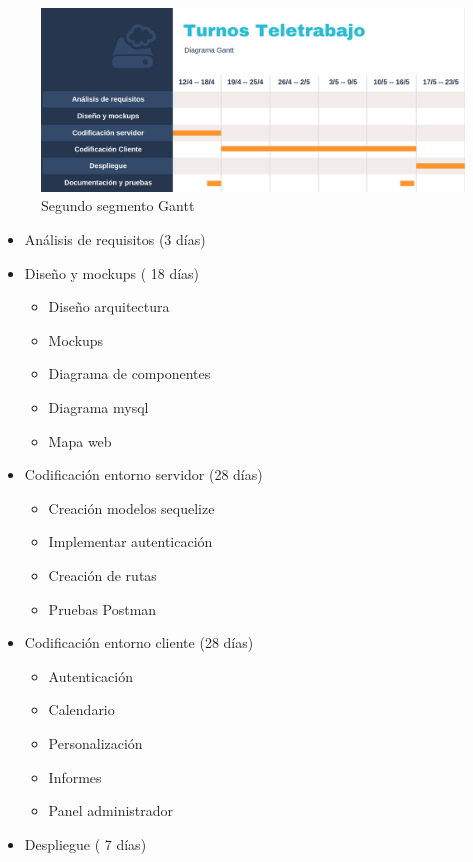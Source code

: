 \documentclass[11pt,spanish,listoffigures,listoftables]{tfgetsinf}
\begin{document}
 \begin{figure}[h!] %
   \includegraphics[width=\linewidth]{img/gantt2.png}
   \caption{Segundo segmento Gantt}
   \label{fig:Gantt21}
 \end{figure}

\begin{itemize}
   \item Análisis de requisitos  (3 días)  
   \item Diseño y mockups ( 18 días)
   \begin{itemize}
      \item Diseño arquitectura
      \item Mockups
      \item Diagrama de componentes
      \item Diagrama mysql
      \item Mapa web
   \end{itemize}
   \item Codificación entorno servidor (28 días)
   \begin{itemize}
      \item Creación modelos sequelize
      \item Implementar autenticación
      \item Creación de rutas
      \item Pruebas Postman
   \end{itemize}
   \item Codificación entorno cliente (28 días)
   \begin{itemize}
      \item Autenticación
      \item Calendario
      \item Personalización
      \item Informes
      \item Panel administrador
   \end{itemize}
   \item Despliegue ( 7 días)

\end{itemize}
\end{document}
